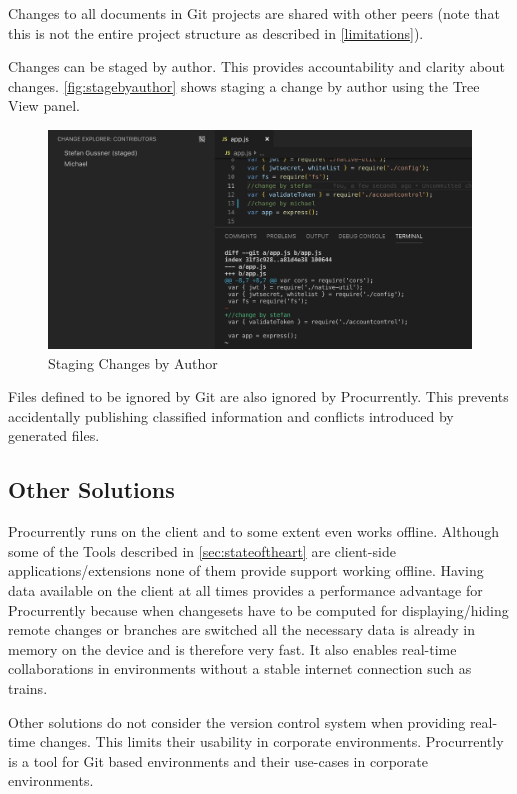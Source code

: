 Changes to all documents in Git projects are shared with other peers (note that this is not the entire project structure as described in \autoref{limitations}).

Changes can be staged by author. This provides accountability and clarity about changes. \autoref{fig:stagebyauthor} shows staging a change by author using the Tree View panel. 

\begin{figure}[hb]
    \centering
    \includegraphics[width=150mm]{figures/screenshots/stage-by-author.png}
	\caption{Staging Changes by Author}
    \label{fig:stagebyauthor}
\end{figure}

Files defined to be ignored by Git are also ignored by Procurrently. This prevents accidentally publishing classified information and conflicts introduced by generated files. 

\subsection{Other Solutions}
Procurrently runs on the client and to some extent even works offline. Although some of the Tools described in \autoref{sec:stateoftheart} are client-side applications/extensions none of them provide support working offline. Having data available on the client at all times provides a performance advantage for Procurrently because when changesets have to be computed for displaying/hiding remote changes or branches are switched all the necessary data is already in memory on the device and is therefore very fast. It also enables real-time collaborations in environments without a stable internet connection such as trains.

Other solutions do not consider the version control system when providing real-time changes. This limits their usability in corporate environments. Procurrently is a tool for Git based environments and their use-cases in corporate environments. 

